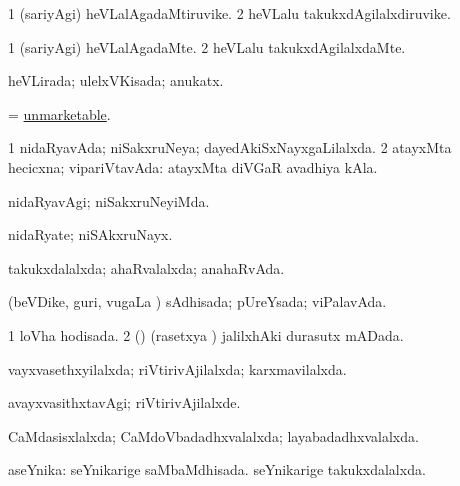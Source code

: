 \bentry
{} 
\gl{\nA}
\expl{}
\bmng
\bnum
\num{1} (sariyAgi) heVLalAgadaMtiruvike. 
\num{2} heVLalu takukxdAgilalxdiruvike. 
\enum
\emng
\eentry

\bentry
{} 
\gl{\kirxvi}
\expl{}
\bmng
\bnum
\num{1} (sariyAgi) heVLalAgadaMte. 
\num{2} heVLalu takukxdAgilalxdaMte. 
\enum
\emng
\eentry

\bentry
{} 
\gl{\gu}
\expl{}
\bmng
heVLirada; ulelxVKisada; anukatx. 
\emng
\eentry

\bentry
{} 
\gl{\gu}
\expl{}
\bmng
= \hyperlink{unmarketable}{unmarketable}. 
\emng
\eentry

\bentry
{} 
\gl{\gu}
\expl{}
\bmng
\bnum
\num{1} nidaRyavAda; niSakxruNeya; dayedAkiSxNayxgaLilalxda. 
\num{2} atayxMta hecicxna; vipariVtavAda:  atayxMta diVGaR avadhiya kAla. 
\enum
\emng
\eentry

\bentry
{} 
\gl{\kirxvi}
\expl{}
\bmng
nidaRyavAgi; niSakxruNeyiMda. 
\emng
\eentry

\bentry
{} 
\gl{\nA}
\expl{}
\bmng
nidaRyate; niSAkxruNayx. 
\emng
\eentry

\bentry
{} 
\gl{\gu}
\expl{}
\bmng
takukxdalalxda; ahaRvalalxda; anahaRvAda. 
\emng
\eentry

\bentry
{} 
\gl{\gu}
\bmng
(beVDike, guri, \mo vugaLa \vi) sAdhisada; pUreYsada; viPalavAda. 
\emng
\eentry

\bentry
{} 
\gl{\gu}
\expl{}
\bmng
\bnum
\num{1} loVha hodisada. 
\num{2} (\birx) (rasetxya \vi) jalilxhAki durasutx mADada. 
\enum
\emng
\eentry

\bentry
{} 
\gl{\gu}
\expl{}
\bmng
vayxvasethxyilalxda; riVtirivAjilalxda; karxmavilalxda. 
\emng
\eentry

\bentry
{} 
\gl{\kirxvi}
\expl{}
\bmng
avayxvasithxtavAgi; riVtirivAjilalxde. 
\emng
\eentry

\bentry
{} 
\gl{\gu}
\expl{}
\bmng
CaMdasisxlalxda; CaMdoVbadadhxvalalxda; layabadadhxvalalxda. 
\emng
\eentry

\bentry
{} 
\gl{\gu}
\expl{}
\bmng
aseYnika: 
\banum
{} seYnikarige saMbaMdhisada. 
 seYnikarige takukxdalalxda. 
\eanum
\emng
\eentry

